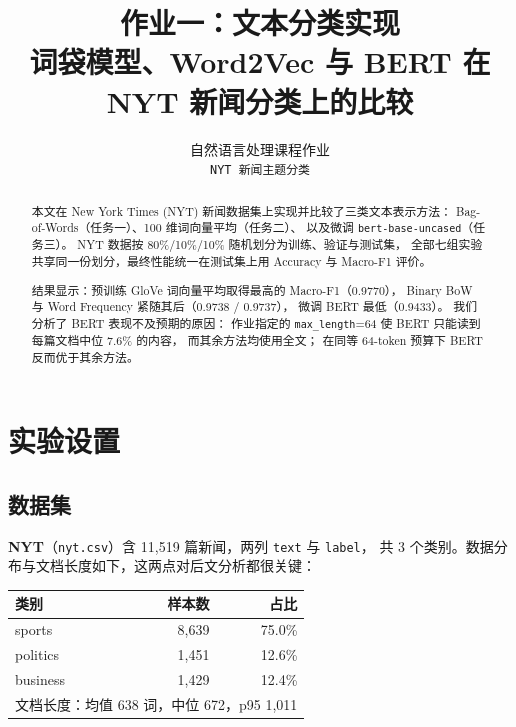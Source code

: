 \documentclass[10pt,twocolumn,letterpaper]{article}
\begin{document}
\title{作业一：文本分类实现\\
\large 词袋模型、Word2Vec 与 BERT 在 NYT 新闻分类上的比较}

\author{自然语言处理课程作业\\
{\tt\small NYT 新闻主题分类}
}

\maketitle

\begin{abstract}
本文在 New York Times (NYT) 新闻数据集上实现并比较了三类文本表示方法：
Bag-of-Words（任务一）、100 维词向量平均（任务二）、
以及微调 \texttt{bert-base-uncased}（任务三）。
NYT 数据按 80\%/10\%/10\% 随机划分为训练、验证与测试集，
全部七组实验共享同一份划分，最终性能统一在测试集上用 Accuracy 与 Macro-F1 评价。

结果显示：预训练 GloVe 词向量平均取得最高的 Macro-F1（0.9770），
Binary BoW 与 Word Frequency 紧随其后（0.9738 / 0.9737），
微调 BERT 最低（0.9433）。
我们分析了 BERT 表现不及预期的原因：
作业指定的 \texttt{max\_length}=64 使 BERT 只能读到每篇文档中位 7.6\% 的内容，
而其余方法均使用全文；
在同等 64-token 预算下 BERT 反而优于其余方法。
\end{abstract}

\section{实验设置}
\label{sec:setup}

\subsection{数据集}

\textbf{NYT}（\texttt{nyt.csv}）含 11{,}519 篇新闻，两列 \texttt{text} 与 \texttt{label}，
共 3 个类别。数据分布与文档长度如下，这两点对后文分析都很关键：

\begin{center}\small
\begin{tabular}{lrr}
\toprule
类别 & 样本数 & 占比 \\
\midrule
sports   & 8{,}639 & 75.0\% \\
politics & 1{,}451 & 12.6\% \\
business & 1{,}429 & 12.4\% \\
\midrule
\multicolumn{3}{l}{文档长度：均值 638 词，中位 672，p95 1{,}011} \\
\bottomrule
\end{tabular}
\end{center}
\end{document}
